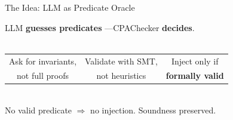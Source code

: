 \begin{frame}{The Idea: LLM as Predicate Oracle}
  \vfill
  \begin{center}
    LLM \textbf{guesses predicates} \quad—\quad CPAChecker \textbf{decides}.\\[1.2em]
    \scalebox{1.05}{}\\[1.4em]
    \begin{tabular}{@{}c@{\quad}c@{\quad}c@{}}
      \small Ask for invariants, & \small Validate with SMT, & \small Inject only if\\
      \small not full proofs & \small not heuristics & \small \textbf{formally valid}
    \end{tabular}\\[1.2em]
    \small\color{GoodGreen} No valid predicate $\Rightarrow$ no injection. \quad Soundness preserved.
  \end{center}
  \vfill
\end{frame}
